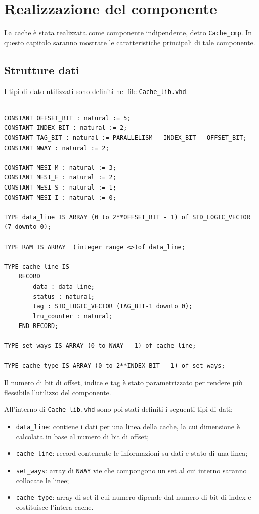 \clearpage{\pagestyle{empty}\cleardoublepage}

\chapter{Realizzazione del componente}

La cache \`e stata realizzata come componente indipendente, detto \texttt{Cache\_cmp}.
In questo capitolo saranno mostrate le caratteristiche principali di tale componente.

\section{Strutture dati}

I tipi di dato utilizzati sono definiti nel file \texttt{Cache\_lib.vhd}.


\begin{lstlisting}

CONSTANT OFFSET_BIT : natural := 5;
CONSTANT INDEX_BIT : natural := 2;
CONSTANT TAG_BIT : natural := PARALLELISM - INDEX_BIT - OFFSET_BIT;
CONSTANT NWAY : natural := 2;

CONSTANT MESI_M : natural := 3;
CONSTANT MESI_E : natural := 2;
CONSTANT MESI_S : natural := 1;
CONSTANT MESI_I : natural := 0;

TYPE data_line IS ARRAY (0 to 2**OFFSET_BIT - 1) of STD_LOGIC_VECTOR (7 downto 0);

TYPE RAM IS ARRAY  (integer range <>)of data_line;

TYPE cache_line IS 
	RECORD
		data : data_line;
		status : natural;
		tag : STD_LOGIC_VECTOR (TAG_BIT-1 downto 0);
		lru_counter : natural;
	END RECORD;

TYPE set_ways IS ARRAY (0 to NWAY - 1) of cache_line;
		
TYPE cache_type IS ARRAY (0 to 2**INDEX_BIT - 1) of set_ways;
\end{lstlisting}


Il numero di bit di offset, indice e tag \`e stato parametrizzato per rendere pi\`u flessibile l'utilizzo del componente.

All'interno di \texttt{Cache\_lib.vhd} sono poi stati definiti i seguenti tipi di dati:
\begin{itemize}
  \item \texttt{data\_line}: contiene i dati per una linea della cache, la cui dimensione \`e calcolata in base al numero di bit di offset;
  \item \texttt{cache\_line}: record contenente le informazioni su dati e stato di una linea;
  \item \texttt{set\_ways}: array di \texttt{NWAY} vie che compongono un set al cui interno saranno collocate le linee;
  \item \texttt{cache\_type}: array di set il cui numero dipende dal numero di bit di index e costituisce l'intera cache.
\end{itemize}

